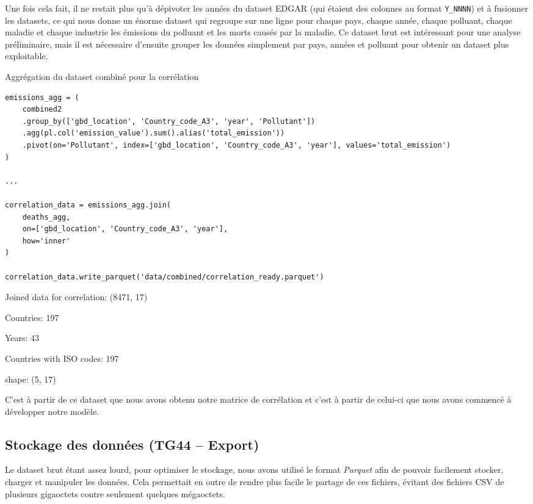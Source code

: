 \documentclass[11pt,a4paper]{article}
\begin{document}
\clearpage
Une fois cela fait, il ne restait plus qu'à dépivoter les années du dataset EDGAR (qui étaient des colonnes au format \lstinline{Y_NNNN}) et à fusionner les datasets, ce qui nous donne un énorme dataset qui regroupe sur une ligne pour chaque pays, chaque année, chaque polluant, chaque maladie et chaque industrie les émissions du polluant et les morts causés par la maladie. Ce dataset brut est intéressant pour une analyse préliminaire, mais il est nécessaire d'ensuite grouper les données simplement par pays, années et polluant pour obtenir un dataset plus exploitable.


\begin{listing}[H]
\caption{Aggrégation du dataset combiné pour la corrélation}
\label{lst:combined_to_corr}
\begin{lstlisting}[style=pythonstyle]
emissions_agg = (
    combined2
    .group_by(['gbd_location', 'Country_code_A3', 'year', 'Pollutant'])
    .agg(pl.col('emission_value').sum().alias('total_emission'))
    .pivot(on='Pollutant', index=['gbd_location', 'Country_code_A3', 'year'], values='total_emission')
)

...

correlation_data = emissions_agg.join(
    deaths_agg,
    on=['gbd_location', 'Country_code_A3', 'year'],
    how='inner'
)

correlation_data.write_parquet('data/combined/correlation_ready.parquet')
\end{lstlisting}
\end{listing}

\begin{listing}[H]
Joined data for correlation: (8471, 17)

Countries: 197

Years: 43

Countries with ISO codes: 197

shape: (5, 17)
\end{listing}

C'est à partir de ce dataset que nous avons obtenu notre matrice de corrélation et c'est à partir de celui-ci que nous avons commencé à développer notre modèle.

\subsection{Stockage des données (TG44 -- Export)}

Le dataset brut étant assez lourd, pour optimiser le stockage, nous avons utilisé le format \emph{Parquet} afin de pouvoir facilement stocker, charger et manipuler les données. Cela permettait en outre de rendre plus facile le partage de ces fichiers, évitant des fichiers CSV de plusieurs gigaoctets contre seulement quelques mégaoctets.
\end{document}
